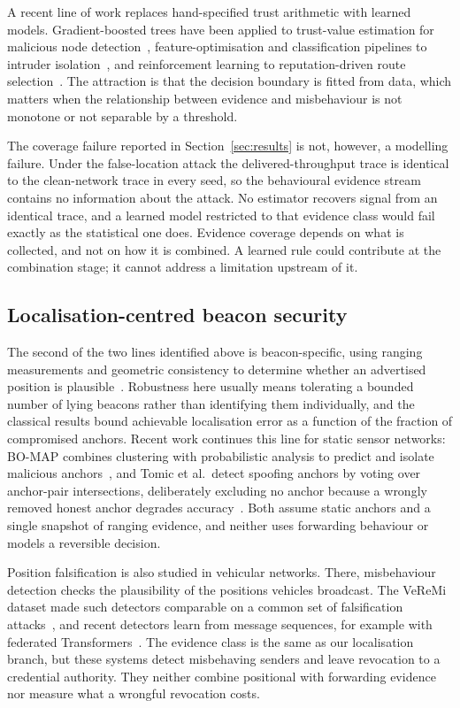 A recent line of work replaces hand-specified trust arithmetic with learned
models. Gradient-boosted trees have been applied to trust-value estimation
for malicious node detection~\cite{dhand2025secure}, feature-optimisation and
classification pipelines to intruder isolation~\cite{kavitha2019india}, and
reinforcement learning to reputation-driven route
selection~\cite{ryu2023reputation}. The attraction is that the decision
boundary is fitted from data, which matters when the relationship
between evidence and misbehaviour is not monotone or not separable by a
threshold.

The coverage failure reported in Section~\ref{sec:results} is not, however,
a modelling failure. Under the false-location attack the delivered-throughput
trace is identical to the clean-network trace in every seed, so the
behavioural evidence stream contains no information about the attack. No
estimator recovers signal from an identical trace, and a learned model
restricted to that evidence class would fail exactly as the statistical one
does. Evidence coverage depends on what is collected, and not on how it is
combined. A learned rule could contribute at the combination stage; it
cannot address a limitation upstream of it.

\subsection{Localisation-centred beacon security}

The second of the two lines identified above is beacon-specific, using ranging measurements and geometric
consistency to determine whether an advertised position is
plausible~\cite{kuriakose2023embn,liu2008attack}. Robustness here usually
means tolerating a bounded number of lying beacons rather than identifying
them individually, and the classical results bound achievable localisation
error as a function of the fraction of compromised anchors. Recent work
continues this line for static sensor networks: BO-MAP combines clustering
with probabilistic analysis to predict and isolate malicious
anchors~\cite{sreeja2024bomap}, and Tomic et al.\ detect spoofing anchors by
voting over anchor-pair intersections, deliberately excluding no anchor
because a wrongly removed honest anchor degrades
accuracy~\cite{tomic2026voting}. Both assume static anchors and a single
snapshot of ranging evidence, and neither uses forwarding behaviour or models
a reversible decision.

Position falsification is also studied in vehicular networks. There,
misbehaviour detection checks the plausibility of the positions vehicles
broadcast. The VeReMi dataset made such detectors comparable on a common set
of falsification attacks~\cite{vanderheijden2018veremi}, and recent detectors
learn from message sequences, for example with federated
Transformers~\cite{khan2026mofed}. The evidence class is the same as our
localisation branch, but these systems detect misbehaving senders and leave
revocation to a credential authority. They neither combine positional with
forwarding evidence nor measure what a wrongful revocation costs.

